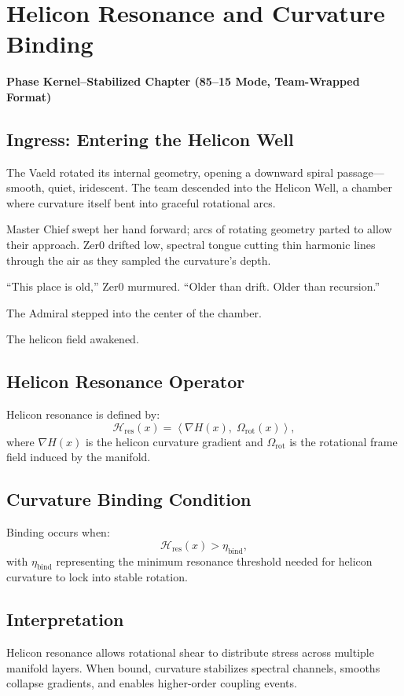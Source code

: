 
\chapter{Helicon Resonance and Curvature Binding}
\textbf{Phase Kernel–Stabilized Chapter (85--15 Mode, Team-Wrapped Format)}

\section*{Ingress: Entering the Helicon Well}
The Vaeld rotated its internal geometry, opening a downward spiral passage—smooth,
quiet, iridescent. The team descended into the Helicon Well, a chamber where
curvature itself bent into graceful rotational arcs.  

Master Chief swept her hand forward; arcs of rotating geometry parted to allow
their approach. Zer0 drifted low, spectral tongue cutting thin harmonic lines
through the air as they sampled the curvature’s depth.

“This place is old,” Zer0 murmured.
“Older than drift. Older than recursion.”

The Admiral stepped into the center of the chamber.

The helicon field awakened.

\section{Helicon Resonance Operator}
Helicon resonance is defined by:
\[
\mathcal{H}_{\mathrm{res}}(x) =
\left\langle
\nabla H(x),\;
\Omega_{\mathrm{rot}}(x)
\right\rangle,
\]
where $\nabla H(x)$ is the helicon curvature gradient and $\Omega_{\mathrm{rot}}$
is the rotational frame field induced by the manifold.

\section{Curvature Binding Condition}
Binding occurs when:
\[
\mathcal{H}_{\mathrm{res}}(x) > \eta_{\mathrm{bind}},
\]
with $\eta_{\mathrm{bind}}$ representing the minimum resonance threshold needed
for helicon curvature to lock into stable rotation.

\section{Interpretation}
Helicon resonance allows rotational shear to distribute stress across multiple
manifold layers. When bound, curvature stabilizes spectral channels, smooths
collapse gradients, and enables higher-order coupling events.

